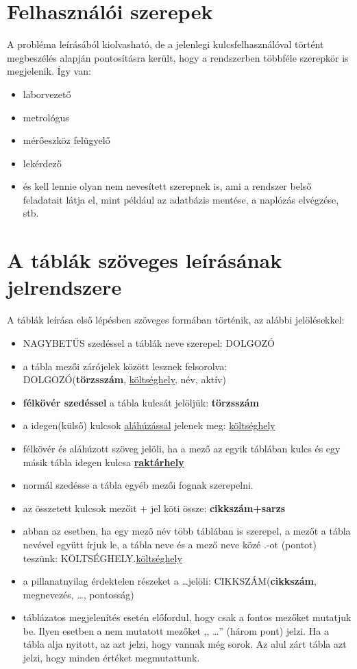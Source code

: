 \documentclass[a4paper,12pt]{report}
\newcommand{\pk}[1]{\textbf{#1}} %
\newcommand{\fk}[1]{\underline{#1}} %
\newcommand{\tabla}[1]{\noindent\MakeUppercase{#1}} %
\newcommand{\tmezo}[2]{\MakeUppercase{#1}.{\underline{#2}}} %
\begin{document}
\section{Felhasználói szerepek}
A probléma leírásából kiolvasható, de a jelenlegi kulcsfelhasználóval történt megbeszélés alapján pontosításra került, hogy a rendszerben többféle szerepkör is megjelenik. Így van:
\begin{itemize}
\item laborvezető
\item metrológus
\item mérőeszköz felügyelő
\item lekérdező
\item és kell lennie olyan nem nevesített szerepnek is, ami a rendszer belső 
feladatait látja el, mint például az adatbázis mentése, a naplózás elvégzése, 
stb.
\end{itemize}

%

\section{A táblák szöveges leírásának jelrendszere}
A táblák leírása első lépésben szöveges formában történik, az alábbi 
jelölésekkel:
\begin{itemize}
 \item \tabla{nagybetűs} szedéssel a táblák neve szerepel: \tabla{dolgozó}
 \item a tábla mezői zárójelek között lesznek felsorolva:\\ 
 \tabla{DOLGOZÓ}(\pk{törzsszám}, \fk{költséghely}, név, aktív)
 \item \pk{félkövér szedéssel} a tábla kulcsát jelöljük: \pk{törzsszám}
 \item a idegen(külső) kulcsok \fk{aláhúzással} jelenek meg: 
 \fk{költséghely}
 \item félkövér és aláhúzott szöveg jelöli, ha a mező az egyik táblában kulcs 
és egy másik tábla idegen kulcsa \pk{\fk{raktárhely}} 
\item normál szedésse a tábla egyéb mezői fognak szerepelni.
\item az összetett kulcsok mezőit $+$ jel köti össze: \pk{cikkszám+sarzs}
\item abban az esetben, ha egy mező név több táblában is szerepel, a mezőt 
a tábla nevével együtt írjuk le, a tábla neve és a mező neve közé .-ot 
(pontot) teszünk: \tmezo{KÖLTSÉGHELY}{költséghely}
\item a pillanatnyilag érdektelen részeket a \dots jelöli:
\tabla{cikkszám}(\pk{cikkszám}, megnevezés, \dots, pontosság)
\item táblázatos megjelenítés esetén előfordul, hogy csak a fontos mezőket 
mutatjuk be. Ilyen esetben a nem mutatott mezőket ,, \dots  '' (három pont) 
jelzi. Ha a tábla alja nyitott, az azt jelzi, hogy vannak még sorok. Az 
alul zárt tábla azt jelzi, hogy minden értéket megmutattunk.
\end{itemize}
\end{document}
